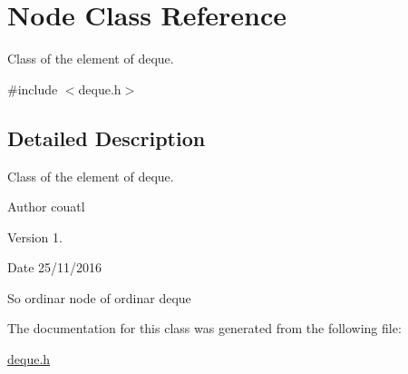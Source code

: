 \hypertarget{class_node}{}\section{Node Class Reference}
\label{class_node}


Class of the element of deque.  




{\ttfamily \#include $<$deque.\+h$>$}



\subsection{Detailed Description}
Class of the element of deque. 

\begin{DoxyAuthor}{Author}
couatl 
\end{DoxyAuthor}
\begin{DoxyVersion}{Version}
1. 
\end{DoxyVersion}
\begin{DoxyDate}{Date}
25/11/2016
\end{DoxyDate}
So ordinar node of ordinar deque 

The documentation for this class was generated from the following file\+:\begin{DoxyCompactItemize}
\item 
\hyperlink{deque_8h}{deque.\+h}\end{DoxyCompactItemize}
